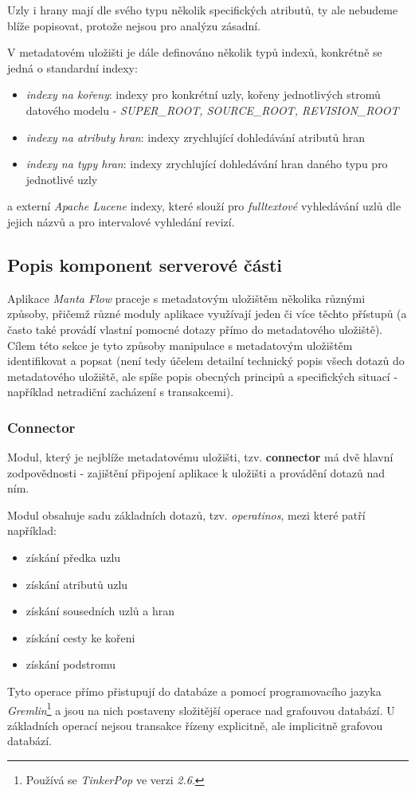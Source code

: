 Uzly i hrany mají dle svého typu několik specifických atributů, ty ale nebudeme blíže popisovat, protože nejsou pro analýzu zásadní.

V metadatovém uložišti je dále definováno několik typů indexů, konkrétně se jedná o standardní indexy:

\begin{itemize}
	\item{\textit{indexy na kořeny}}: indexy pro konkrétní uzly, kořeny jednotlivých stromů datového modelu - \textit{SUPER\_ROOT, SOURCE\_ROOT, REVISION\_ROOT}
	\item{\textit{indexy na atributy hran}}: indexy zrychlující dohledávání atributů hran
	\item{\textit{indexy na typy hran}}: indexy zrychlující dohledávání hran daného typu pro jednotlivé uzly
\end{itemize}

a externí \textit{Apache Lucene} indexy, které slouží pro \textit{fulltextové} vyhledávání uzlů dle jejich názvů a pro intervalové vyhledání revizí.


\subsection{Popis komponent serverové části}
\label{sec:ana_components}

Aplikace \textit{Manta Flow} praceje s metadatovým uložištěm několika různými způsoby, přičemž různé moduly aplikace využívají jeden či více těchto přístupů (a často také provádí vlastní pomocné dotazy přímo do metadatového uložiště). Cílem této sekce je tyto způsoby manipulace s metadatovým uložištěm identifikovat a popsat (není tedy účelem detailní technický popis všech dotazů do metadatového uložiště, ale spíše popis obecných principů a specifických situací - například netradiční zacházení s transakcemi).

\subsubsection{Connector}
\label{sec:ana_connector}
Modul, který je nejblíže metadatovému uložišti, tzv. \textbf{connector} má dvě hlavní zodpovědnosti - zajištění připojení aplikace k uložišti a provádění dotazů nad ním.

Modul obsahuje sadu základních dotazů, tzv. \textit{operatinos}, mezi které patří například:
\begin{itemize}
	\item{získání předka uzlu}
	\item{získání atributů uzlu}
	\item{získání sousedních uzlů a hran}
	\item{získání cesty ke kořeni}
	\item{získání podstromu}
\end{itemize}
Tyto operace přímo přistupují do databáze a pomocí programovacího jazyka \textit{Gremlin}\footnote{Používá se \textit{TinkerPop} ve verzi \textit{2.6}.} a jsou na nich postaveny složitější operace nad grafouvou databází. U základních operací nejsou transakce řízeny explicitně, ale implicitně grafovou databází.

